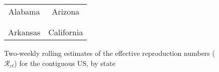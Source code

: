 \documentclass[12pt]{article}
\begin{document}
\begin{figure}[!p]%
\caption
{Two-weekly rolling estimates of the effective reproduction numbers ($\mathcal
{R}_{et}$) for the contiguous US, by state}%
\vspace{-0.3cm}%
\label{fig: Re_states}

\begin{center}%
\hspace*{-0.2cm}%
\begin{tabular}
[c]{cc}%
{\footnotesize Alabama} & {\footnotesize Arizona}\\%
{\includegraphics[
height=1.7772in,
width=3.5293in
]%
{figs/US-Re-AL-2W.png}%
}
&
{\includegraphics[
height=1.7772in,
width=3.5293in
]%
{figs/US-Re-AZ-2W.png}%
}
\\
& \\
{\footnotesize Arkansas} & {\footnotesize California}\\%

\end{tabular}
\end{center}
\end{figure}
\end{document}
